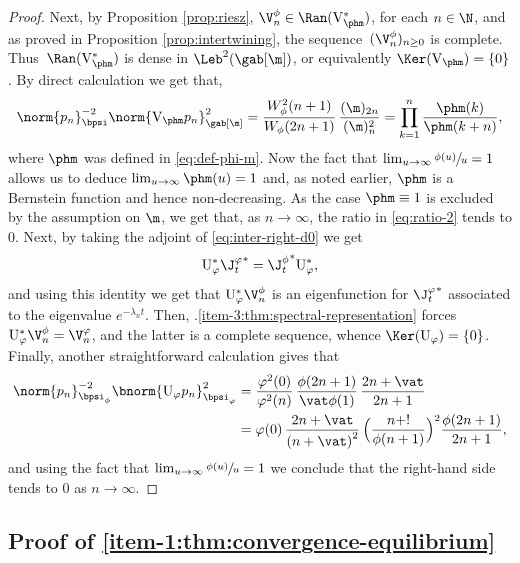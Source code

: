 \begin{proof}
Next, by Proposition \ref{prop:riesz}, \hbox{$\V_n^\phi \in \Ran(\mathrm{V}_{\phm}^*)$}, for each $n \in \N$, and as proved in Proposition \ref{prop:intertwining}, the sequence~$(\V_n^\phi)_{n \geq 0}$ is complete. Thus~$\Ran(\mathrm{V}_{\phm}^*)$ is dense in $\Leb^2(\gab[\m])$, or equivalently $\Ker(\mathrm{V}_{\phm}) = \{0\}$. By direct calculation we get that,
\begin{equation}
\label{eq:ratio-2}
\norm{p_n}_{\bpsi}^{-2} \norm{\mathrm{V}_{\phm} p_n}_{\gab[\m]}^2 = \frac{W_\phi^2(n+1)}{W_\phi(2n+1)}\, \frac{(\m)_{2n}}{(\m)_n^2} = \prod_{k=1}^n \frac{\phm(k)}{\phm(k+n)},
\end{equation}
where $\phm$ was defined in \eqref{eq:def-phi-m}. Now the fact that $\lim_{u \to \infty} \sfrac{\phi(u)}{u} = 1$ allows us to deduce $\lim_{u \to \infty} \phm(u) = 1$ and, as noted earlier, $\phm$ is a Bernstein function and hence non-decreasing. As the case $\phm \equiv 1$ is excluded by the assumption on $\m$, we get that, as $n \to \infty$, the ratio in \eqref{eq:ratio-2} tends to 0. Next, by taking the adjoint of \eqref{eq:inter-right-d0} we get
\begin{equation*}
\mathrm{U}_\varphi^* {\J_t^\varphi}^* = {\J_t^\phi}^* \mathrm{U}_\varphi^*,
\end{equation*}
and using this identity we get that $\mathrm{U}_\varphi^* \V_n^\phi$ is an eigenfunction for ${\J_t^\varphi}^*$ associated to the eigenvalue $e^{-\lambda_n t}$. Then, .\eqref{item-3:thm:spectral-representation} forces $\mathrm{U}_\varphi^* \V_n^\phi = \V_n^\varphi$, and the latter is a complete sequence, whence $\Ker(\mathrm{U}_\varphi) = \{0\}$. Finally, another straightforward calculation gives that
\begin{align*}
\norm{p_n}_{\bpsi_\phi}^{-2} \bnorm{\mathrm{U}_{\varphi} p_n}_{\bpsi_\varphi}^2 &= \frac{\varphi^2(0)}{\varphi^2(n)}\, \frac{\phi(2n+1)}{\vat \phi(1)}\, \frac{2n+\vat}{2n+1}\\
&= \varphi(0)\, \frac{2n+\vat}{\left(n+\vat\right)^2}\, \Bigl(\frac{n+!}{\phi(n+1)}\Bigr)^2 \frac{\phi(2n+1)}{2n+1},
\end{align*}
and using the fact that $\lim_{u \to \infty} \sfrac{\phi(u)}{u} = 1$ we conclude that the right-hand side tends to 0 as $n \to \infty$.
\end{proof}

\subsection{Proof of \eqref{item-1:thm:convergence-equilibrium}}


